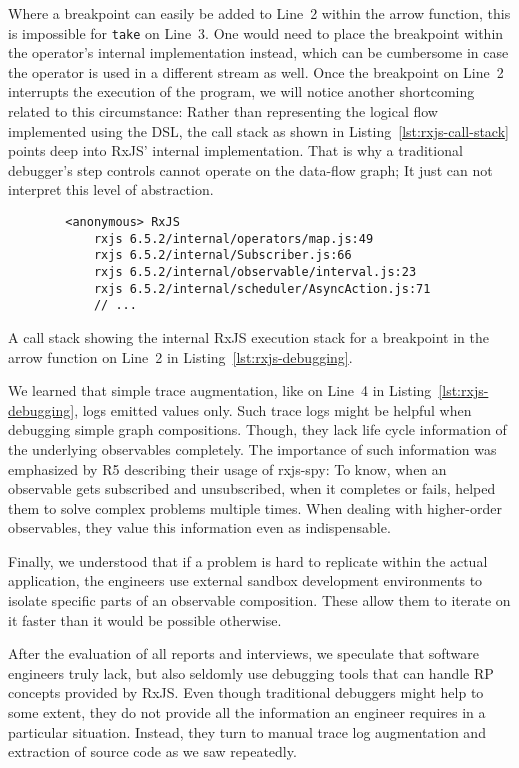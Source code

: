 \documentclass[sigplan,screen]{acmart}
\begin{document}
Where a breakpoint can easily be added to Line~2 within the arrow function, this is impossible for \texttt{take} on Line~3. One would need to place the breakpoint within the operator's internal implementation instead, which can be cumbersome in case the operator is used in a different stream as well. Once the breakpoint on Line~2 interrupts the execution of the program, we will notice another shortcoming related to this circumstance: Rather than representing the logical flow implemented using the DSL, the call stack as shown in Listing~\ref{lst:rxjs-call-stack} points deep into RxJS' internal implementation. That is why a traditional debugger's step controls cannot operate on the data-flow graph; It just can not interpret this level of abstraction.

\begin{listing}
	\begin{verbatim}
		<anonymous> RxJS
			rxjs 6.5.2/internal/operators/map.js:49
			rxjs 6.5.2/internal/Subscriber.js:66
			rxjs 6.5.2/internal/observable/interval.js:23
			rxjs 6.5.2/internal/scheduler/AsyncAction.js:71
			// ...
	\end{verbatim}
	\caption{A call stack showing the internal RxJS execution stack for a breakpoint in the arrow function on Line~2 in Listing~\ref{lst:rxjs-debugging}.}
	\label{lst:rxjs-call-stack}
\end{listing}

We learned that simple trace augmentation, like on Line~4 in Listing~\ref{lst:rxjs-debugging}, logs emitted values only. Such trace logs might be helpful when debugging simple graph compositions. Though, they lack life cycle information of the underlying observables completely. The importance of such information was emphasized by R5 describing their usage of rxjs-spy: To know, when an observable gets subscribed and unsubscribed, when it completes or fails, helped them to solve complex problems multiple times. When dealing with higher-order observables, they value this information even as indispensable.

Finally, we understood that if a problem is hard to replicate within the actual application, the engineers use external sandbox development environments to isolate specific parts of an observable composition. These allow them to iterate on it faster than it would be possible otherwise.

After the evaluation of all reports and interviews, we speculate that software engineers truly lack, but also seldomly use debugging tools that can handle RP concepts provided by RxJS. Even though traditional debuggers might help to some extent, they do not provide all the information an engineer requires in a particular situation. Instead, they turn to manual trace log augmentation and extraction of source code as we saw repeatedly.
\end{document}
